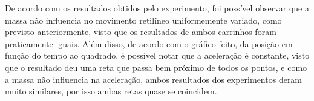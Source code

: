 De acordo com os resultados obtidos pelo experimento, foi possível observar que a massa não influencia no movimento retilíneo uniformemente variado, como previsto anteriormente, visto que os resultados de ambos carrinhos foram praticamente iguais. Além disso, de acordo com o gráfico feito, da posição em função do tempo ao quadrado, é possível notar que a aceleração é constante, visto que o resultado deu uma reta que passa bem próximo de todos os pontos, e como a massa não influencia na aceleração, ambos resultados dos experimentos deram muito similares, por isso ambas retas quase se coincidem.

